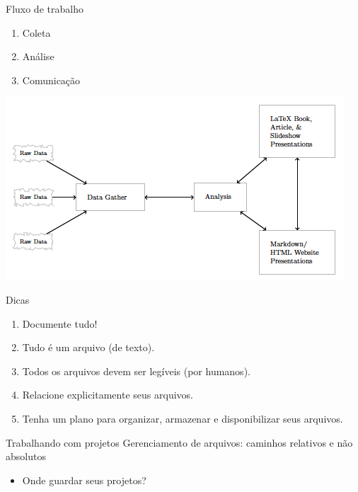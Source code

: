 \documentclass[
  9pt,
  ignorenonframetext,
]{beamer}
\providecommand{\tightlist}{%
  \setlength{\itemsep}{0pt}\setlength{\parskip}{0pt}}
\begin{document}
\begin{frame}{Fluxo de trabalho}
\protect\hypertarget{fluxo-de-trabalho}{}
\begin{enumerate}
\item
  Coleta
\item
  Análise
\item
  Comunicação
\end{enumerate}
\end{frame}

\begin{frame}{}
\protect\hypertarget{section}{}
\begin{center}\includegraphics[width=1\linewidth]{imgs/fluxo_gandrud} \end{center}
\end{frame}

\begin{frame}{Dicas}
\protect\hypertarget{dicas}{}
\begin{enumerate}
\item
  Documente tudo!
\item
  Tudo é um arquivo (de texto).
\item
  Todos os arquivos devem ser legíveis (por humanos).
\item
  Relacione explicitamente seus arquivos.
\item
  Tenha um plano para organizar, armazenar e disponibilizar seus
  arquivos.
\end{enumerate}
\end{frame}

\begin{frame}{Trabalhando com projetos}
\protect\hypertarget{trabalhando-com-projetos}{}
Gerenciamento de arquivos: caminhos relativos e não absolutos

\begin{itemize}
\tightlist
\item
  Onde guardar seus projetos?
\end{itemize}
\end{frame}
\end{document}
